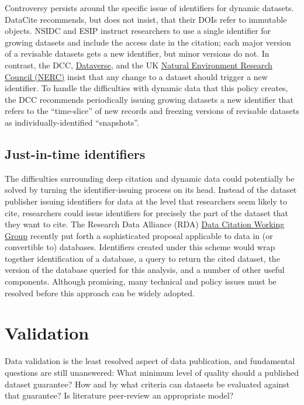 \documentclass[10pt,a4paper,twocolumn]{article}
\begin{document}
{Controversy persists around the specific issue of identifiers for dynamic datasets. 
DataCite recommends, but does not insist, that their DOIs refer to immutable objects.
NSIDC and ESIP instruct researchers to use a single identifier for growing datasets and include the access date in the citation; each major version of a revisable datasets gets a new identifier, but minor versions do not.
In contrast, the DCC, \href{http://thedata.org/}{Dataverse}, and the UK \href{http://www.nerc.ac.uk/}{Natural Environment Research Council (NERC)} insist that any change to a dataset should trigger a new identifier\cite{ball_how_2012,altman_proposed_2007,sarah_callaghan_making_2012}.
To handle the difficulties with dynamic data that this policy creates, the DCC recommends periodically issuing growing datasets a new identifier that refers to the ``time-slice'' of new records and freezing versions of revisable datasets as individually-identified ``snapshots''.

\subsection*{Just-in-time identifiers}\label{just-in-time-identifiers}

The difficulties surrounding deep citation and dynamic data could potentially be solved by turning the identifier-issuing process on its head.
Instead of the dataset publisher issuing identifiers for data at the level that researchers seem likely to cite, researchers could issue identifiers for precisely the part of the dataset that they want to cite.
The Research Data Alliance (RDA) \href{http://rd-alliance.org/working-groups/data-citation-wg.html}{Data Citation Working Group} recently put forth a sophisticated proposal applicable to data in (or convertible to) databases.
Identifiers created under this scheme would wrap together identification of a database, a query to return the cited dataset, the version of the database queried for this analysis, and a number of other useful components.
Although promising, many technical and policy issues must be resolved before this approach can be widely adopted.


\section*{Validation}\label{validation}

Data validation is the least resolved aspect of data publication, and fundamental questions are still unanswered:
What minimum level of quality should a published dataset guarantee?
How and by what criteria can datasets be evaluated against that guarantee?
Is literature peer-review an appropriate model?

}
\end{document}
